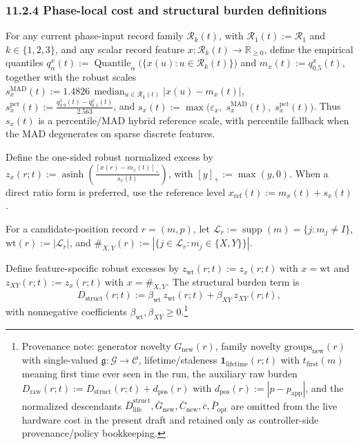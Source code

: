 \documentclass[11pt]{article}
\begin{document}
\subsubsection*{11.2.4 Phase-local cost and structural burden definitions}
For any current phase-input record family \(\mathcal R_k(t)\), with \(\mathcal R_1(t):=\mathcal R_1\) and \(k\in\{1,2,3\}\), and any scalar record feature \(x:\mathcal R_k(t)\to\mathbb R_{\ge 0}\), define the empirical quantiles \(q_\alpha^x(t):=\operatorname{Quantile}_\alpha\bigl(\{x(u):u\in\mathcal R_k(t)\}\bigr)\) and \(m_x(t):=q_{0.5}^x(t)\), together with the robust scales \(s_x^{\mathrm{MAD}}(t):=1.4826\,\operatorname{median}_{u\in\mathcal R_k(t)}\bigl|x(u)-m_x(t)\bigr|\), \(s_x^{\mathrm{pct}}(t):=\frac{q_{0.9}^x(t)-q_{0.1}^x(t)}{2.563}\), and \(s_x(t):=\max\!\bigl(\varepsilon_x,\;s_x^{\mathrm{MAD}}(t),\;s_x^{\mathrm{pct}}(t)\bigr)\). Thus \(s_x(t)\) is a percentile/MAD hybrid reference scale, with percentile fallback when the MAD degenerates on sparse discrete features.

Define the one-sided robust normalized excess by \(z_x(r;t):=\operatorname{asinh}\!\left(\frac{[x(r)-m_x(t)]_+}{s_x(t)}\right)\), with \([y]_+:=\max(y,0)\). When a direct ratio form is preferred, use the reference level \(x_{\mathrm{ref}}(t):=m_x(t)+s_x(t)\).

For a candidate-position record \(r=(m,p)\), let \(\mathcal L_r:=\operatorname{supp}(m)=\{j:m_j\neq I\}\), \(\mathrm{wt}(r):=|\mathcal L_r|\), and \(\#_{X,Y}(r):=\left|\{j\in\mathcal L_r:m_j\in\{X,Y\}\}\right|\).

Define feature-specific robust excesses by \(z_{\mathrm{wt}}(r;t):=z_x(r;t)\ \text{with }x=\mathrm{wt}\) and \(z_{XY}(r;t):=z_x(r;t)\ \text{with }x=\#_{X,Y}\). The structural burden term is
\[
D_{\mathrm{struct}}(r;t):=
\beta_{\mathrm{wt}}\,z_{\mathrm{wt}}(r;t)
+\beta_{XY}\,z_{XY}(r;t),
\]
with nonnegative coefficients \(\beta_{\mathrm{wt}},\beta_{XY}\ge 0\).\footnote{Provenance note: generator novelty \(G_{\mathrm{new}}(r)\), family novelty \(\mathrm{groups}_{\mathrm{new}}(r)\) with single-valued \(\mathfrak g:\mathcal G\to\mathcal C\), lifetime/staleness \(\mathbf 1_{\mathrm{lifetime}}(r;t)\) with \(t_{\mathrm{first}}(m)\) meaning first time ever seen in the run, the auxiliary raw burden \(D_{\mathrm{raw}}(r;t):=D_{\mathrm{struct}}(r;t)+d_{\mathrm{pos}}(r)\) with \(d_{\mathrm{pos}}(r):=|p-p_{\mathrm{app}}|\), and the normalized descendants \(\bar D_{\mathrm{life}}^{\mathrm{struct}},\bar G_{\mathrm{new}},\bar C_{\mathrm{new}},\bar c,\bar P_{\mathrm{opt}}\) are omitted from the live hardware cost in the present draft and retained only as controller-side provenance/policy bookkeeping.}
\end{document}
